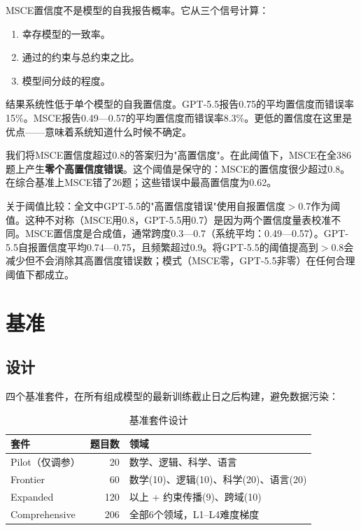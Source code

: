 \documentclass[11pt,a4paper]{ctexart}
\begin{document}
MSCE置信度不是模型的自我报告概率。它从三个信号计算：

\begin{enumerate}
    \item 幸存模型的一致率。
    \item 通过的约束与总约束之比。
    \item 模型间分歧的程度。
\end{enumerate}

结果系统性低于单个模型的自我置信度。GPT-5.5报告0.75的平均置信度而错误率15\%。MSCE报告0.49—0.57的平均置信度而错误率8.3\%。更低的置信度在这里是优点——意味着系统知道什么时候不确定。

我们将MSCE置信度超过0.8的答案归为"高置信度"。在此阈值下，MSCE在全386题上产生\textbf{零个高置信度错误}。这个阈值是保守的：MSCE的置信度很少超过0.8。在综合基准上MSCE错了26题；这些错误中最高置信度为0.62。

关于阈值比较：全文中GPT-5.5的"高置信度错误"使用自报置信度$>$0.7作为阈值。这种不对称（MSCE用0.8，GPT-5.5用0.7）是因为两个置信度量表校准不同。MSCE置信度是合成值，通常跨度0.3—0.7（系统平均：0.49—0.57）。GPT-5.5自报置信度平均0.74—0.75，且频繁超过0.9。将GPT-5.5的阈值提高到$>$0.8会减少但不会消除其高置信度错误数；模式（MSCE零，GPT-5.5非零）在任何合理阈值下都成立。

\section{基准}

\subsection{设计}

四个基准套件，在所有组成模型的最新训练截止日之后构建，避免数据污染：

\begin{table}[ht]
\centering
\caption{基准套件设计}
\begin{tabular}{lrl}
\toprule
\textbf{套件} & \textbf{题目数} & \textbf{领域} \\
\midrule
Pilot（仅调参） & 20 & 数学、逻辑、科学、语言 \\
Frontier & 60 & 数学(10)、逻辑(10)、科学(20)、语言(20) \\
Expanded & 120 & 以上 + 约束传播(9)、跨域(10) \\
Comprehensive & 206 & 全部6个领域，L1--L4难度梯度 \\
\bottomrule
\end{tabular}
\end{table}
\end{document}
